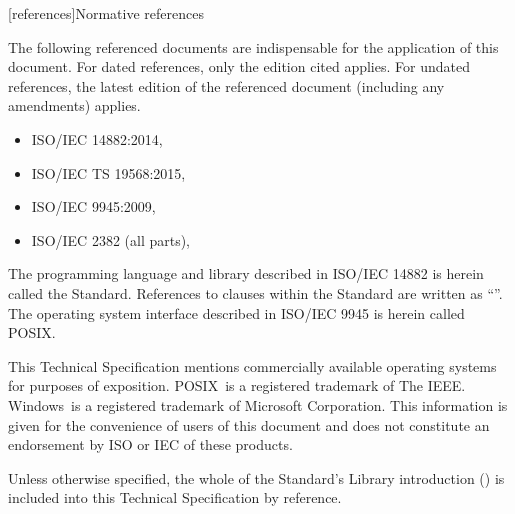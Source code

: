 
[references]{Normative references}

\pnum
The following referenced documents are indispensable for the application of this document. For dated references, only the edition cited applies. For undated references, the latest edition of the referenced document (including any amendments) applies.

\begin{itemize}
\item ISO/IEC 14882:2014, 
\item ISO/IEC TS 19568:2015, 
\item ISO/IEC 9945:2009, 
\item ISO/IEC 2382 (all parts), 
\end{itemize}

\pnum
The programming language and library described in ISO/IEC 14882 is herein called the \Cpp Standard.
References to clauses within the \Cpp Standard are written as ``''.
The operating system interface described in ISO/IEC 9945 is herein called POSIX.

\pnum
This Technical Specification mentions commercially available operating systems for purposes of exposition.  POSIX\textregistered\ is a registered trademark of The IEEE. Windows\textregistered\ is a registered trademark of Microsoft Corporation. This information is given for the convenience of users of this document and does not constitute an endorsement by ISO or IEC of these products.

\pnum
Unless otherwise specified, the whole of the \Cpp Standard's Library introduction () is included into this Technical Specification by reference.


